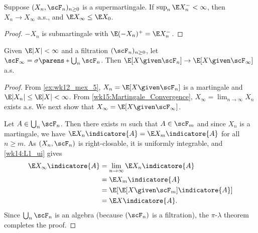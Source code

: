 \documentclass[../aipt.tex]{subfiles}
\begin{document}
\begin{Corollary}\label{wk15:Supermartingale_Convergence}
Suppose $(X_n,\scF_n)_{n\geq0}$ is a supermartingale. If $\sup_n \E X_n^- <\infty$, then $X_n\to X_\infty$ a.s., and $\E X_\infty \leq \E X_0$.
\end{Corollary}
\begin{proof}
$-X_n$ is submartingale with $\E(-X_n)^+ = \E X_n^-$.
\end{proof}



\begin{Theorem}\label{wk15:LevyConvergence}
Given $\E|X|<\infty$ and a filtration $(\scF_n)_{n\geq0}$, let $\scF_\infty=\sigma\parens*{\bigcup_n \scF_n}$. Then $\E[X \given \scF_n] \to \E[X \given \scF_\infty]$ a.s.
\end{Theorem}
\begin{proof}
From \cref{ex:wk12_mex_5}, $X_n = \E[X \given \scF_n]$ is a martingale and $\E|X_n| \leq \E|X| <\infty$. From \cref{wk15:Martingale_Convergence}, $X_\infty = \lim_{n\to\infty} X_n$ exists a.s. We next show that $X_\infty = \E[ X \given \scF_\infty]$. 

Let $A\in \bigcup_n \scF_n$. Then there exists $m$ such that $A\in\scF_m$ and since $X_n$ is a martingale, we have $\E X_n\indicatore{A} = \E X_m\indicatore{A}$ for all $n\geq m$. As $(X_n,\scF_n)$ is right-closable, it is uniformly integrable, and \cref{wk14:L1_ui} gives
\begin{align*}
\E X_\infty\indicatore{A} 
&= \lim_{n\to\infty} \E X_n\indicatore{A} \\
&= \E X_m\indicatore{A} \\
&= \E[ {\E[X \given \scF_m]}\indicatore{A}] \\
&= \E X\indicatore{A}.
\end{align*}
Since $\bigcup_n \scF_n$ is an algebra (because $(\scF_n)$ is a filtration), the $\pi$-$\lambda$ theorem completes the proof.
\end{proof}
\end{document}
